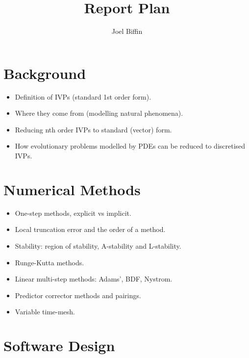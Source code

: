 \documentclass[11pt,a4paper]{article}
\begin{document}

\title{Report Plan}
\author{Joel Biffin}
\maketitle





\section{Background}

\begin{itemize}
  \item{Definition of IVPs (standard 1st order form).}
  \item{Where they come from (modelling natural phenomena).}
  \item{Reducing nth order IVPs to standard (vector) form.}
  \item{How evolutionary problems modelled by PDEs can be reduced to discretised IVPs.}
\end{itemize}

\section{Numerical Methods}

\begin{itemize}
  \item{One-step methods, explicit vs implicit.}
  \item{Local truncation error and the order of a method.}
  \item{Stability: region of stability, A-stability and L-stability.}
  \item{Runge-Kutta methods.}
  \item{Linear multi-step methods: Adams’, BDF, Nystrom.}
  \item{Predictor corrector methods and pairings.}
  \item{Variable time-mesh.}
\end{itemize}

\section{Software Design}
\end{document}
